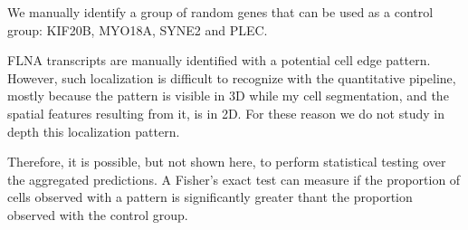 We manually identify a group of random genes that can be used as a control group: KIF20B, MYO18A, SYNE2 and PLEC.

FLNA transcripts are manually identified with a potential cell edge pattern.
However, such localization is difficult to recognize with the quantitative pipeline, mostly because the pattern is visible in 3D while my cell segmentation, and the spatial features resulting from it, is in 2D.
For these reason we do not study in depth this localization pattern.

Therefore, it is possible, but not shown here, to perform statistical testing over the aggregated predictions.
A Fisher's exact test can measure if the proportion of cells observed with a pattern is significantly greater thant the proportion observed with the control group.








